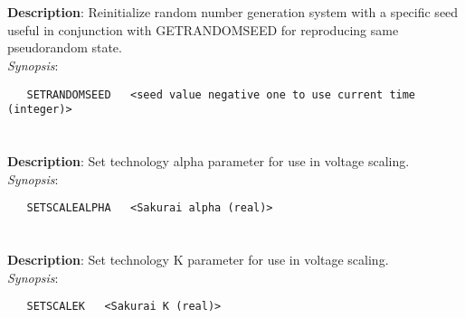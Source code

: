 \section{\quad{}}
\label{manpages:SETRANDOMSEED}
\label{manpages:setrandomseed}
\vspace{-0.1in}
{\bf Description}: 	Reinitialize random number generation system with a specific seed useful in conjunction with GETRANDOMSEED for reproducing same pseudorandom state.\\[1.5ex]
{\em Synopsis}:
\vspace{-0.05in}
\scriptsize
\begin{lstlisting}
   SETRANDOMSEED   <seed value negative one to use current time (integer)>	
\end{lstlisting}
\normalsize
\vspace{-0.05in}


\section{\quad{}}
\label{manpages:SETSCALEALPHA}
\label{manpages:setscalealpha}
\vspace{-0.1in}
{\bf Description}: 	Set technology alpha parameter for use in voltage scaling.\\[1.5ex]
{\em Synopsis}:
\vspace{-0.05in}
\scriptsize
\begin{lstlisting}
   SETSCALEALPHA   <Sakurai alpha (real)>															
\end{lstlisting}
\normalsize
\vspace{-0.05in}


\section{\quad{}}
\label{manpages:SETSCALEK}
\label{manpages:setscalek}
\vspace{-0.1in}
{\bf Description}: 	Set technology K parameter for use in voltage scaling.\\[1.5ex]
{\em Synopsis}:
\vspace{-0.05in}
\scriptsize
\begin{lstlisting}
   SETSCALEK   <Sakurai K (real)>																
\end{lstlisting}
\normalsize
\vspace{-0.05in}



